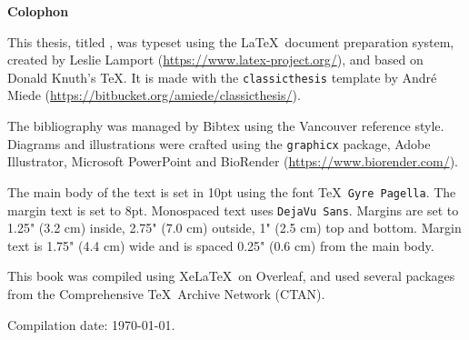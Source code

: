 \ifodd\value{page}
\hbox{}
\newpage
\fi

\thispagestyle{empty} %
\vspace*{\fill} %
\begin{center}
\begin{adjustwidth}{1in}{1in}

{\Large \textbf{Colophon}}

\vspace{1cm}

This thesis, titled \textit{\thesistitle}, was typeset using the \LaTeX\ document preparation system, created by Leslie Lamport ({\url{https://www.latex-project.org/}}), and based on Donald Knuth's \TeX. It is made with the \texttt{classicthesis} template by André Miede ({\url{https://bitbucket.org/amiede/classicthesis/}}).

\vspace{0.5cm}

The bibliography was managed by Bibtex using the Vancouver reference style. Diagrams and illustrations were crafted using the \texttt{graphicx} package, Adobe Illustrator, Microsoft PowerPoint and BioRender ({\url{https://www.biorender.com/}}).

\vspace{0.5cm}

The main body of the text is set in 10pt using the font \TeX\ \texttt{Gyre Pagella}. The margin text is set to 8pt. Monospaced text uses \texttt{DejaVu Sans}. Margins are set to 1.25" (3.2 cm) inside, 2.75" (7.0 cm) outside, 1" (2.5 cm) top and bottom. Margin text is 1.75" (4.4 cm) wide and is spaced 0.25" (0.6 cm) from the main body.

\vspace{0.5cm}

This book was compiled using Xe\LaTeX\ on Overleaf, and used several packages from the Comprehensive \TeX\ Archive Network (CTAN).

\vspace{0.5cm}

Compilation date: \today. %
\end{adjustwidth}
\end{center}
